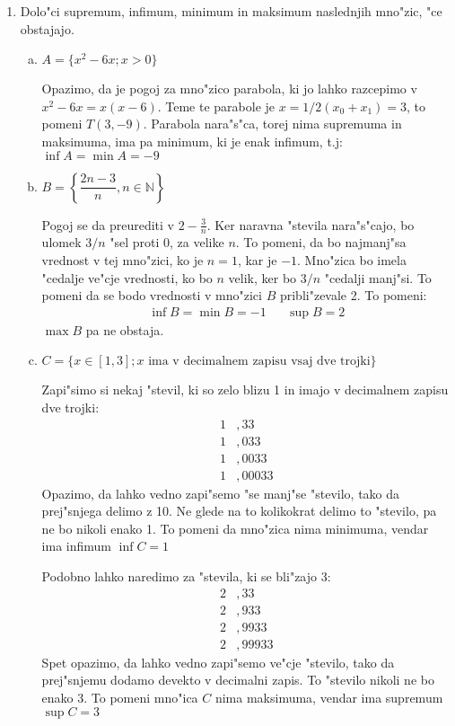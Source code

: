 \documentclass[12pt,a4paper,slovene]{article}
\newcommand{\NN}{\mathbb{N}}
\begin{document}
\begin{enumerate}[(1)]
	\item Dolo"ci supremum, infimum, minimum in maksimum naslednjih mno"zic, "ce obstajajo.
	\begin{enumerate}[(a)]
		\item $A = \{x^2 - 6x; x > 0\}$
		
		Opazimo, da je pogoj za mno"zico parabola, ki jo lahko razcepimo v $x^2 - 6x = x(x-6)$. Teme te parabole je $x = 1/2(x_0 + x_1) = 3$, to pomeni $T(3, -9)$. Parabola nara"s"ca, torej nima supremuma in maksimuma, ima pa minimum, ki je enak infimum, t.j: $\inf A = \min A = -9$
		
		\item $B = \left\{\dfrac{2n-3}{n}, n \in \NN\right\}$
		
		Pogoj se da preurediti v $2 - \frac{3}{n}$. Ker naravna "stevila nara"s"cajo, bo ulomek $3/n$ "sel proti 0, za velike $n$. To pomeni, da bo najmanj"sa vrednost v tej mno"zici, ko je $n=1$, kar je $-1$. Mno"zica bo imela "cedalje ve"cje vrednosti, ko bo $n$ velik, ker bo $3/n$ "cedalji manj"si. To pomeni da se bodo vrednosti v mno"zici $B$ pribli"zevale 2. To pomeni:
		\begin{align*}
		\inf B = \min B = -1 && \sup B = 2
		\end{align*}
		$\max B$ pa ne obstaja.
		
		\item $C = \{x \in [1,3]; \text{$x$ ima v decimalnem zapisu vsaj dve trojki}\}$
	
		Zapi"simo si nekaj "stevil, ki so zelo blizu 1 in imajo v decimalnem zapisu dve trojki:
		\begin{align*}
		1&,33\\
		1&,033\\
		1&,0033\\
		1&,00033
		\end{align*}
		Opazimo, da lahko vedno zapi"semo "se manj"se "stevilo, tako da prej"snjega delimo z 10. Ne glede na to kolikokrat delimo to "stevilo, pa ne bo nikoli enako 1. To pomeni da mno"zica nima minimuma, vendar ima infimum $\inf C = 1$
		
		Podobno lahko naredimo za "stevila, ki se bli"zajo 3:
		\begin{align*}
		2&,33\\
		2&,933\\
		2&,9933\\
		2&,99933
		\end{align*}
		Spet opazimo, da lahko vedno zapi"semo ve"cje "stevilo, tako da prej"snjemu dodamo devekto v decimalni zapis. To "stevilo nikoli ne bo enako 3. To pomeni mno"ica $C$ nima maksimuma, vendar ima supremum $\sup C = 3$
		

\end{enumerate}
\end{enumerate}
\end{document}
